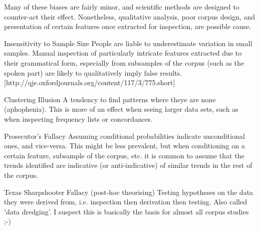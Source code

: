Many of these biases are fairly minor, and scientific methods are designed to counter-act their effect.  Nonetheless, qualitative analysis, poor corpus design, and presentation of certain features once extracted for inspection, are possible cause.  


\begin{itemizeTitle}
    \item[Insensitivity to Sample Size] People are liable to underestimate variation in small samples.  Manual inspection of particularly intricate features extracted due to their grammatical form, especially from subsamples of the corpus (such as the spoken part) are likely to qualitatively imply false results. [http://qje.oxfordjournals.org/content/117/3/775.short]
    \item[Clustering Illusion] A tendency to find patterns where theye are none (aphophenia).  This is more of an effect when seeing larger data sets, such as when inspecting frequency lists or concordances.
    \item[Prosecutor's Fallacy] Assuming conditional probabilities indicate unconditional ones, and vice-versa.  This might be less prevalent, but when conditioning on a certain feature, subsample of the corpus, etc. it is common to assume that the trends identified are indicative (or anti-indicative) of similar trends in the rest of the corpus.
    \item[Texas Sharpshooter Fallacy (post-hoc theorising)] Testing hypotheses on the data they were derived from, i.e. inspection then derivation then testing.  Also called 'data dredging'.  I suspect this is basically the basis for almost all corpus studies ;-)
\end{itemizeTitle}




